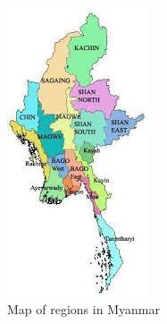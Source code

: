\documentclass{book}\usepackage{knitr}
\begin{document}
\begin{figure}
\includegraphics[width=\linewidth]{images/myanmar/Image3.jpg}
\caption{Map of regions in Myanmar}
\end{figure}
\end{document}
